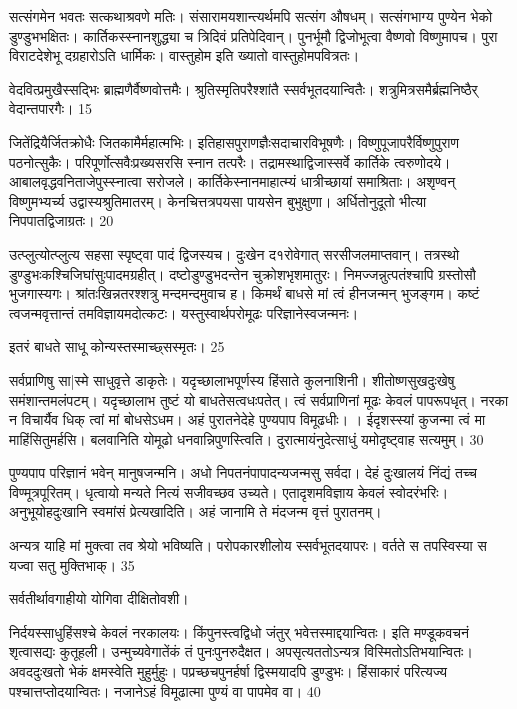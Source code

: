 सत्संगमेन भवतः सत्कथाश्रवणे मतिः।
संसारामयशान्त्यर्थमपि सत्संग औषधम्।
सत्संगभाग्य पुण्येन भेको डुण्डुभभक्षितः।
कार्तिकस्स्नानशुद्ध्या च त्रिदिवं प्रतिपेदिवान्।
पुनर्भूमौ द्विजोभूत्वा वैष्णवो विष्णुमापच।
पुरा विराटदेशेभू दग्रहारोऽति धार्मिकः।
वास्तुहोम इति ख्यातो वास्तुहोमपवित्रतः।

वेदवित्प्रमुखैस्सद्भिः ब्राह्मणैर्वैष्णवोत्तमैः।
श्रुतिस्मृतिपरैश्शांतै स्सर्वभूतदयान्वितैः।
शत्रुमित्रसमैर्ब्रह्मनिष्ठैर् वेदान्तपारगैः।
15

जितेंद्रियैर्जितक्रोधैः जितकामैर्महात्मभिः।
इतिहासपुराणज्ञैःसदाचारविभूषणैः।
विष्णुपूजापरैर्विष्णुपुराण पठनोत्सुकैः।
परिपूर्णोत्सवैःप्रख्यसरसि स्नान तत्परैः।
तद्रामस्थाद्विजास्सर्वे कार्तिके त्वरुणोदये।
आबालवृद्धवनिताजेपुस्स्नात्वा सरोजले।
कार्तिकेस्नानमाहात्म्यं धात्रीच्छायां समाश्रिताः।
अशृण्वन् विष्णुमभ्यर्च्य उद्वास्यश्रुतिमातरम्।
केनचित्तत्रपयसा पायसेन बुभुक्षुणा।
अर्धितोनुदूतो भीत्या निपपातद्विजाग्रतः।
20

उत्प्लुत्योत्प्लुत्य सहसा स्पृष्ट्वा पादं द्विजस्यच।
दुःखेन द१रोवेगात् सरसीजलमाप्तवान्।
तत्रस्थो डुण्डुभःकश्चिजिघांसुःपादमग्रहीत्।
दष्टोडुण्डुभदन्तेन चुक्रोशभृशमातुरः।
निमज्जन्नुत्पतंश्चापि ग्रस्तोसौ भुजगास्यगः।
श्रांतःखिन्नतरश्शत्रु मन्दमन्दमुवाच ह।
किमर्थं बाधसे मां त्वं हीनजन्मन् भुजङ्गम।
कष्टं त्वजन्मवृत्तान्तं तमविज्ञायमदोत्कटः।
यस्तुस्वार्थपरोमूढः परिज्ञानेस्वजन्मनः।

इतरं बाधते साधू कोन्यस्तस्माच्छ्सस्मृतः।
25

सर्वप्राणिषु सा|स्मे साधुवृत्ते डाकृतेः।
यदृच्छालाभपूर्णस्य हिंसाते कुलनाशिनी।
शीतोष्णसुखदुःखेषु समंशान्तमलंपटम्।
यदृच्छालाभ तुष्टं यो बाधतेसत्वधःपतेत्।
त्वं सर्वप्राणिनां मूढः केवलं पापरूपधृत्।
नरका न विचार्यैव धिक् त्वां मां बोधसेऽधम।
अहं पुरातनेदेहे पुण्यपाप विमूढधीः।
।
ईदृशस्स्यां कुजन्मा त्वं मा माहिंसितुमर्हसि।
बलवानिति योमूढो धनवान्निपुणस्त्विति।
दुरात्मायंनुदेत्साधुं यमोदृष्ट्वाह सत्यमुम्।
30

पुण्यपाप परिज्ञानं भवेन् मानुषजन्मनि।
अधो निपतनंपापादन्यजन्मसु सर्वदा।
देहं दुःखालयं निंद्यं तच्च विण्मूत्रपूरितम्।
धृत्वायो मन्यते नित्यं सजीवच्छव उच्यते।
एतादृशमविज्ञाय केवलं स्वोदरंभरिः।
अनुभूयोहदुःखानि स्वमांसं प्रेत्यखादिति।
अहं जानामि ते मंदजन्म वृत्तं पुरातनम्।

अन्यत्र याहि मां मुक्त्वा तव श्रेयो भविष्यति।
परोपकारशीलोय स्सर्वभूतदयापरः।
वर्तते स तपस्विस्या स यज्वा सतु मुक्तिभाक्।
35

सर्वतीर्थावगाहीयो योगिवा दीक्षितोवशी।

निर्दयस्साधुहिंसश्चे केवलं नरकालयः।
किंपुनस्त्वद्विधो जंतुर् भवेत्तस्माद्दयान्वितः।
इति मण्डूकवचनं शृत्वासद्यः कुतूहली।
उन्मुच्यवेगातेंकं तं पुनःपुनरुदैक्षत।
अपसृत्यततोऽन्यत्र विस्मितोऽतिभयान्वितः।
अवददुःखतो भेकं क्षमस्वेति मुहुर्मुहुः।
पप्रच्छचपुनर्हर्षा द्विस्मयादपि डुण्डुभः।
हिंसाकारं परित्यज्य पश्चात्तप्तोदयान्वितः।
नजानेऽहं विमूढात्मा पुण्यं वा पापमेव वा।
40

